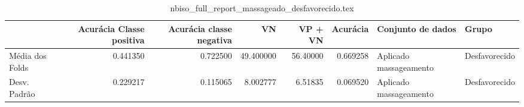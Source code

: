 \begin{table}
\centering
\caption{nbiso_full_report_massageado_desfavorecido.tex}
\label{nbiso_full_report_massageado_desfavorecido.tex}
\begin{tabular}{lrrrrrll}
\toprule
{}              &  Acurácia Classe positiva &  Acurácia classe negativa &        VN  &  VP + VN  &  Acurácia &       Conjunto de dados &          Grupo \\
\midrule
Média dos Folds &                  0.441350 &                  0.722500 &  49.400000 &  56.40000 &  0.669258 &  Aplicado massageamento &  Desfavorecido \\
Desv. Padrão    &                  0.229217 &                  0.115065 &   8.002777 &   6.51835 &  0.069520 &  Aplicado massageamento &  Desfavorecido \\
\bottomrule
\end{tabular}
\end{table}
